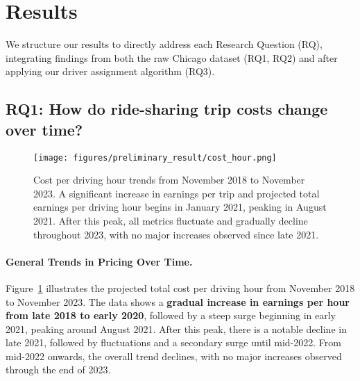 \section{Results}
We structure our results to directly address each Research Question (RQ), integrating findings from both the raw Chicago dataset (RQ1, RQ2) and after applying our driver assignment algorithm (RQ3). 

\subsection{RQ1: How do ride-sharing trip costs change over time?}
\label{RQ1}
\begin{figure}[h]
  \centering
  \texttt{[image: figures/preliminary\_result/cost\_hour.png]}
  \caption{Cost per driving hour trends from November 2018 to November 2023. A significant increase in earnings per trip and projected total earnings per driving hour begins in January 2021, peaking in August 2021. After this peak, all metrics fluctuate and gradually decline throughout 2023, with no major increases observed since late 2021.}
  \label{by_hour}
\end{figure}



\label{sec:results-pricing-stablization}

\paragraph{\textbf{General Trends in Pricing Over Time.}}
Figure~\ref{by_hour} illustrates the projected total cost per driving hour from November 2018 to November 2023. The data shows a \textbf{gradual increase in earnings per hour from late 2018 to early 2020}, followed by a steep surge beginning in early 2021, peaking around August 2021. After this peak, there is a notable decline in late 2021, followed by fluctuations and a secondary surge until mid-2022. From mid-2022 onwards, the overall trend declines, with no major increases observed through the end of 2023.

